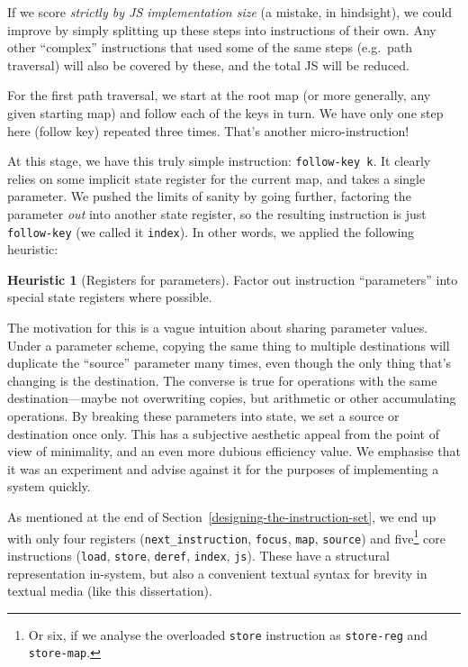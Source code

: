\documentclass[ twoside,openright,titlepage,numbers=noenddot,headinclude,footinclude,cleardoublepage=empty,abstract=on,
                BCOR=5mm,paper=a4,fontsize=11pt
                ]{scrreprt}
\theoremstyle{definition}
\newtheorem{heuristic}{Heuristic}
\begin{document}
If we score \emph{strictly by \ac{JS} implementation size} (a mistake,
in hindsight), we could improve by simply splitting up these steps into
instructions of their own. Any other ``complex'' instructions that used
some of the same steps (e.g.~path traversal) will also be covered by
these, and the total \ac{JS} will be reduced.

For the first path traversal, we start at the root map (or more
generally, any given starting map) and follow each of the keys in turn.
We have only one step here (follow key) repeated three times. That's
another micro-instruction!

At this stage, we have this truly simple instruction:
\texttt{follow-key\ k}. It clearly relies on some implicit state
register for the current map, and takes a single parameter. We pushed
the limits of sanity by going further, factoring the parameter
\emph{out} into another state register, so the resulting instruction is
just \texttt{follow-key} (we called it \texttt{index}). In other words,
we applied the following heuristic:

\begin{heuristic}[Registers for parameters]
Factor out instruction ``parameters'' into special state registers where possible.
\label{reg-for-param}
\end{heuristic}

The motivation for this is a vague intuition about sharing parameter
values. Under a parameter scheme, copying the same thing to multiple
destinations will duplicate the ``source'' parameter many times, even
though the only thing that's changing is the destination. The converse
is true for operations with the same destination---maybe not overwriting
copies, but arithmetic or other accumulating operations. By breaking
these parameters into state, we set a source or destination once only.
This has a subjective aesthetic appeal from the point of view of
minimality, and an even more dubious efficiency value. We emphasise that
it was an experiment and advise against it for the purposes of
implementing a system quickly.

As mentioned at the end of Section~\ref{designing-the-instruction-set},
we end up with only four registers (\texttt{next\_instruction},
\texttt{focus}, \texttt{map}, \texttt{source}) and five\footnote{Or six,
  if we analyse the overloaded \texttt{store} instruction as
  \texttt{store-reg} and \texttt{store-map}.} core instructions
(\texttt{load}, \texttt{store}, \texttt{deref}, \texttt{index},
\texttt{js}). These have a structural representation in-system, but also
a convenient textual syntax for brevity in textual media (like this
dissertation).
\end{document}
